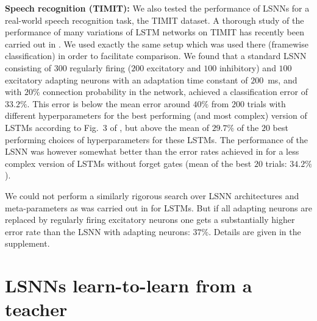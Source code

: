 \documentclass{article} \pdfoutput=1
\begin{document}
\textbf{Speech recognition (TIMIT):}
We also tested the performance of LSNNs for a real-world speech recognition task, the TIMIT dataset.
A thorough study of the performance of many variations of LSTM networks on TIMIT has recently been carried out in \cite{greff2017lstm}.
We used exactly the same setup which was used there (framewise classification) in order to facilitate comparison.
We found that a standard LSNN consisting of $300$ regularly firing ($200$ excitatory and $100$ inhibitory) and $100$ excitatory adapting neurons with an adaptation time constant of $200$~ms, and
with $20\%$ connection probability in the network, achieved a classification error of $33.2\%$.
This error is below the mean error around $40\%$ from $200$ trials with different hyperparameters for the best performing (and most complex)
version of LSTMs according to Fig.~3 of \cite{greff2017lstm}, but above the mean of $29.7\%$ of the $20$ best performing choices of hyperparameters for these LSTMs.
The performance of the LSNN was however somewhat better than the error rates achieved in \cite{greff2017lstm} for a less complex version of LSTMs without forget gates (mean of the best $20$ trials: $34.2\%$).

We could not perform a similarly rigorous search over LSNN architectures and meta-parameters as was carried out in \cite{greff2017lstm} for LSTMs.
But if all adapting neurons are replaced by regularly firing excitatory neurons one gets a substantially higher error rate than the LSNN with adapting neurons: $37\%$. Details are given in the supplement.

\section{LSNNs learn-to-learn from a teacher}\label{sec:L2L}
\end{document}
